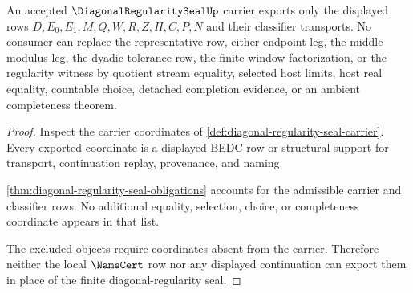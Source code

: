 \begin{theorem}
\label{thm:diagonal-regularity-seal-nonescape}
An accepted $\DiagonalRegularitySealUp$ carrier exports only the displayed rows $D,E_0,E_1,M,Q,W,R,Z,H,C,P,N$ and their classifier transports. No consumer can replace the representative row, either endpoint leg, the middle modulus leg, the dyadic tolerance row, the finite window factorization, or the regularity witness by quotient stream equality, selected host limits, host real equality, countable choice, detached completion evidence, or an ambient completeness theorem.
\end{theorem}
\begin{proof}
Inspect the carrier coordinates of \autoref{def:diagonal-regularity-seal-carrier}. Every exported coordinate is a displayed BEDC row or structural support for transport, continuation replay, provenance, and naming.

\autoref{thm:diagonal-regularity-seal-obligations} accounts for the admissible carrier and classifier rows. No additional equality, selection, choice, or completeness coordinate appears in that list.

The excluded objects require coordinates absent from the carrier. Therefore neither the local $\NameCert$ row nor any displayed continuation can export them in place of the finite diagonal-regularity seal.
\end{proof}

